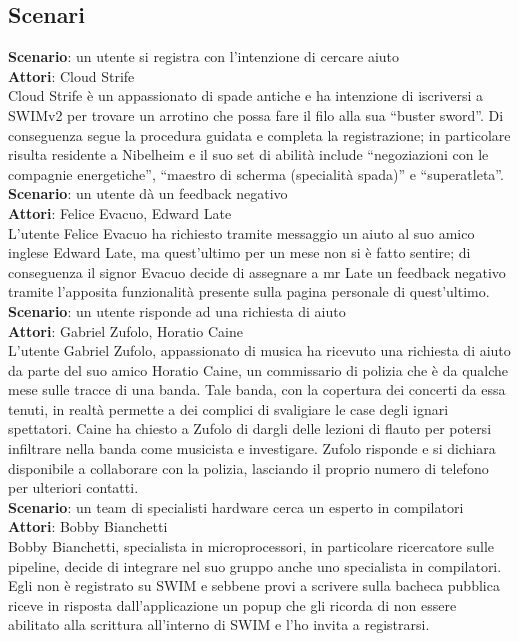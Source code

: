 \documentclass[a4paper,12pt]{article}
\begin{document}
\subsection{Scenari}
\textbf{Scenario}: un utente si registra con l'intenzione di cercare aiuto \\
\textbf{Attori}: Cloud Strife \\
Cloud Strife è un appassionato di spade antiche e ha intenzione di iscriversi a SWIMv2 per trovare un arrotino che possa fare il filo alla sua “buster sword”. Di conseguenza segue la procedura guidata  e completa la registrazione; in particolare risulta residente a Nibelheim e il suo set di abilità include “negoziazioni con le compagnie energetiche”, “maestro di scherma (specialità spada)” e “superatleta”. \\[1.5em]
\textbf{Scenario}: un utente dà un feedback negativo \\
\textbf{Attori}: Felice Evacuo, Edward Late \\
L'utente Felice Evacuo ha richiesto tramite messaggio un aiuto al suo amico inglese Edward Late, ma quest'ultimo per un mese non si è fatto sentire; di conseguenza il signor Evacuo decide di assegnare a mr Late un feedback negativo tramite l'apposita funzionalità presente sulla pagina personale di quest'ultimo. \\[1.5em]
\textbf{Scenario}: un utente risponde ad una richiesta di aiuto \\
\textbf{Attori}: Gabriel Zufolo, Horatio Caine \\
L'utente Gabriel Zufolo, appassionato di musica ha ricevuto una richiesta di aiuto da parte del suo amico Horatio Caine, un commissario di polizia che è da qualche mese sulle tracce di una banda. Tale banda, con la copertura dei concerti da essa tenuti, in realtà permette a dei complici di svaligiare le case degli ignari spettatori. Caine ha chiesto a Zufolo di dargli delle lezioni di flauto per potersi infiltrare nella banda come musicista e investigare. Zufolo risponde e si dichiara disponibile a collaborare con la polizia, lasciando il proprio numero di telefono per ulteriori contatti. \\[1.5em]
\textbf{Scenario}: un team di specialisti hardware cerca un esperto in compilatori \\
\textbf{Attori}: Bobby Bianchetti \\
Bobby Bianchetti, specialista in microprocessori, in particolare ricercatore sulle pipeline, decide di integrare nel suo gruppo anche uno specialista in compilatori. Egli non è registrato su SWIM e sebbene provi a scrivere sulla bacheca pubblica riceve in risposta dall'applicazione un popup che gli ricorda di non essere abilitato alla scrittura all'interno di SWIM e l'ho invita a registrarsi.   \\[1.5em]
\end{document}

